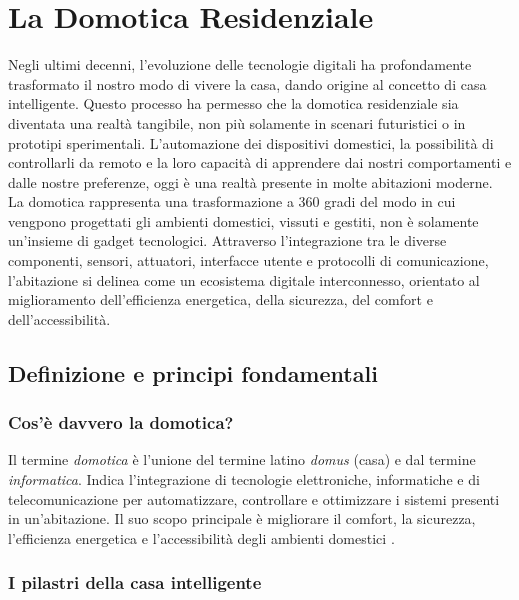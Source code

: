 
\chapter{La Domotica Residenziale}

Negli ultimi decenni, l’evoluzione delle tecnologie digitali ha profondamente trasformato il nostro modo di vivere la casa, dando origine al concetto di casa intelligente. Questo processo ha permesso che la domotica residenziale sia diventata una realtà tangibile, non più solamente in scenari futuristici o in prototipi sperimentali. L'automazione dei dispositivi domestici, la possibilità di controllarli da remoto e la loro capacità di apprendere dai nostri comportamenti e dalle nostre preferenze, oggi è una realtà presente in molte abitazioni moderne.\\

La domotica rappresenta una trasformazione a 360 gradi del modo in cui vengpono progettati gli ambienti domestici, vissuti e gestiti, non è solamente un'insieme di gadget tecnologici. Attraverso l’integrazione tra le diverse componenti, sensori, attuatori, interfacce utente e protocolli di comunicazione, l’abitazione si delinea come un ecosistema digitale interconnesso, orientato al miglioramento dell’efficienza energetica, della sicurezza, del comfort e dell’accessibilità.\\

\section{Definizione e principi fondamentali}

\subsection{Cos'è davvero la domotica?}

Il termine \textit{domotica} è l'unione del termine latino \textit{domus} (casa) e dal termine \textit{informatica}. Indica l'integrazione di tecnologie elettroniche, informatiche e di telecomunicazione per automatizzare, controllare e ottimizzare i sistemi presenti in un'abitazione. Il suo scopo principale è migliorare il comfort, la sicurezza, l'efficienza energetica e l'accessibilità degli ambienti domestici \parencite{domoticaWiki}.

\subsection{I pilastri della casa intelligente}

